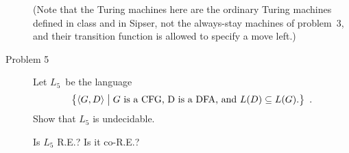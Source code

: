\documentclass[letterpaper,12pt]{article}
\begin{document}
\begin{description}
  (Note that the Turing machines here are the ordinary Turing machines
  defined in class and in Sipser, not the always-stay machines of
  problem~3, and their transition function is allowed to specify a
  move left.)

\item[Problem 5] Let $L_5$~be the language
  \begin{displaymath}
    \bigl\{
        \langle G, D \rangle
      \bigm|
      \text{$G$~is a CFG, D is a DFA, and
        $L(D) \subseteq L(G)$.}
      \bigr\} \enspace.
  \end{displaymath}
  Show that $L_5$ is undecidable.

  Is $L_5$ R.E.?  Is it co-R.E.?

\end{description}
\end{document}
